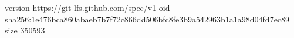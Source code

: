 version https://git-lfs.github.com/spec/v1
oid sha256:1e476bca860abaeb7b7f72c866dd506bfc8fe3b9a542963b1a1a98d04fd7ec89
size 350593
